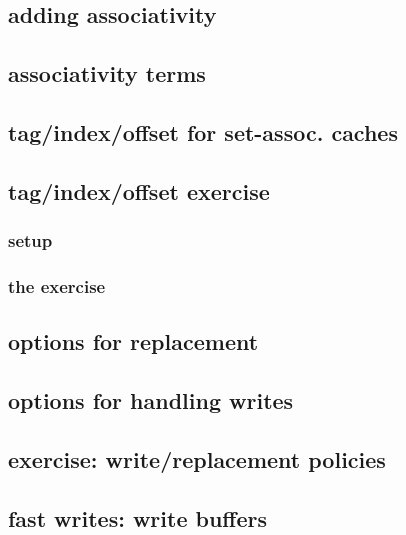 \subsection{adding associativity}



\subsection{associativity terms}


\subsection{tag/index/offset for set-assoc. caches}


\subsection{tag/index/offset exercise}
\subsubsection{setup}

\subsubsection{the exercise}


\subsection{options for replacement}



\subsection{options for handling writes}


\subsection{exercise: write/replacement policies}


\subsection{fast writes: write buffers}


